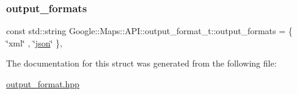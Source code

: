 \mbox{\label{a00055_a53d106f6d688b90fcf744fd3764a73ab}} 
\subsubsection{\texorpdfstring{output\+\_\+formats}{output\_formats}}
{\footnotesize\ttfamily const std\+::string Google\+::\+Maps\+::\+A\+P\+I\+::output\+\_\+format\+\_\+t\+::output\+\_\+formats = \{ \char`\"{}xml\char`\"{} , \char`\"{}\hyperlink{a00011_ab701e3ac61a85b337ec5c1abaad6742d}{json}\char`\"{} \}\hspace{0.3cm}{\ttfamily [static]}, {\ttfamily [private]}}



The documentation for this struct was generated from the following file\+:\begin{DoxyCompactItemize}
\item 
\hyperlink{a00026}{output\+\_\+format.\+hpp}\end{DoxyCompactItemize}
